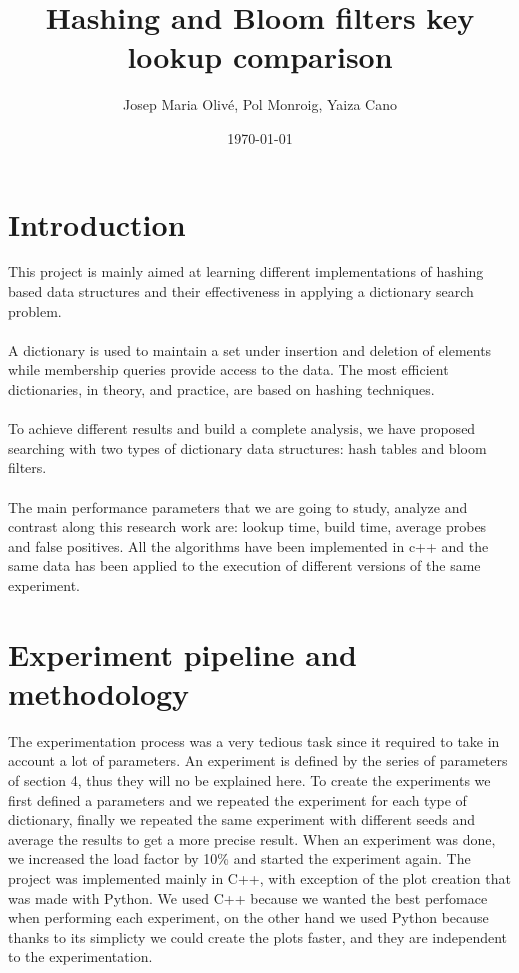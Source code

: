 \documentclass{article}
\title{Hashing and Bloom filters key lookup comparison}
\author{Josep Maria Olivé, Pol Monroig, Yaiza Cano}
\date{\today}
\begin{document}
    \maketitle
    \thispagestyle{empty}
 
    \section{Introduction}
        This project is mainly aimed at learning different implementations of hashing based data structures and their effectiveness in applying a dictionary search problem. \\\\
A dictionary is used to maintain a set under insertion and deletion of elements while membership queries provide access to the data. The most efficient dictionaries, in theory, and practice, are based on hashing techniques. \\\\
To achieve different results and build a complete analysis, we have proposed searching with two types of dictionary data structures: hash tables and bloom filters. \\\\
The main performance parameters that we are going to study, analyze and contrast along this research work are: lookup time, build time, average probes and false positives.
All the algorithms have been implemented in c++ and the same data has been applied to the execution of different versions of the same experiment. 

    \section{Experiment pipeline and methodology}
        The experimentation process was a very tedious task since it required to take in account a lot of parameters. An experiment is defined by the series of parameters of section 4, thus they will no be explained here. To create the experiments we first defined a parameters and we repeated the experiment for each type of dictionary, finally we repeated the same experiment with different seeds and average the results to get a more precise result. When an experiment was done, we increased the load factor by 10\% and started the experiment again. The project was implemented mainly in C++, with exception of the plot creation that was made with Python. We used C++ because we wanted the best perfomace when performing each experiment, on the other hand we used Python because thanks to its simplicty we could create the plots faster, and they are independent to the experimentation. 
        
\end{document}
